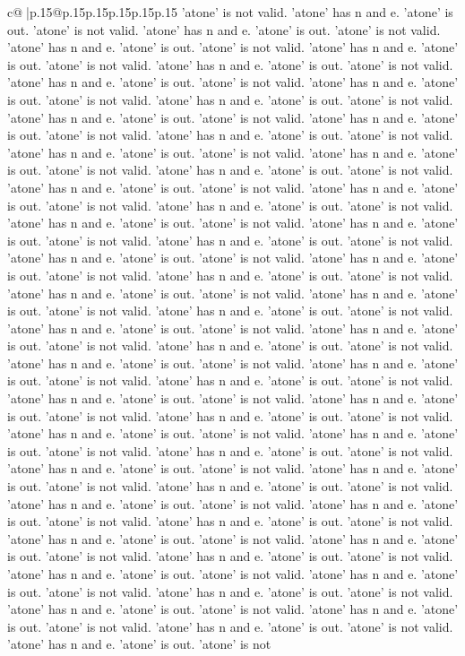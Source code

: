 \documentclass{article}
\begin{document}
{\begin{supertabular}{c@{$\;$}|p{.15\linewidth}@{}p{.15\linewidth}p{.15\linewidth}p{.15\linewidth}p{.15\linewidth}p{.15\linewidth}}
{{{'atone' is not valid. 'atone' has n and e. 'atone' is out. 'atone' is not valid. 'atone' has n and e. 'atone' is out. 'atone' is not valid. 'atone' has n and e. 'atone' is out. 'atone' is not valid. 'atone' has n and e. 'atone' is out. 'atone' is not valid. 'atone' has n and e. 'atone' is out. 'atone' is not valid. 'atone' has n and e. 'atone' is out. 'atone' is not valid. 'atone' has n and e. 'atone' is out. 'atone' is not valid. 'atone' has n and e. 'atone' is out. 'atone' is not valid. 'atone' has n and e. 'atone' is out. 'atone' is not valid. 'atone' has n and e. 'atone' is out. 'atone' is not valid. 'atone' has n and e. 'atone' is out. 'atone' is not valid. 'atone' has n and e. 'atone' is out. 'atone' is not valid. 'atone' has n and e. 'atone' is out. 'atone' is not valid. 'atone' has n and e. 'atone' is out. 'atone' is not valid. 'atone' has n and e. 'atone' is out. 'atone' is not valid. 'atone' has n and e. 'atone' is out. 'atone' is not valid. 'atone' has n and e. 'atone' is out. 'atone' is not valid. 'atone' has n and e. 'atone' is out. 'atone' is not valid. 'atone' has n and e. 'atone' is out. 'atone' is not valid. 'atone' has n and e. 'atone' is out. 'atone' is not valid. 'atone' has n and e. 'atone' is out. 'atone' is not valid. 'atone' has n and e. 'atone' is out. 'atone' is not valid. 'atone' has n and e. 'atone' is out. 'atone' is not valid. 'atone' has n and e. 'atone' is out. 'atone' is not valid. 'atone' has n and e. 'atone' is out. 'atone' is not valid. 'atone' has n and e. 'atone' is out. 'atone' is not valid. 'atone' has n and e. 'atone' is out. 'atone' is not valid. 'atone' has n and e. 'atone' is out. 'atone' is not valid. 'atone' has n and e. 'atone' is out. 'atone' is not valid. 'atone' has n and e. 'atone' is out. 'atone' is not valid. 'atone' has n and e. 'atone' is out. 'atone' is not valid. 'atone' has n and e. 'atone' is out. 'atone' is not valid. 'atone' has n and e. 'atone' is out. 'atone' is not valid. 'atone' has n and e. 'atone' is out. 'atone' is not valid. 'atone' has n and e. 'atone' is out. 'atone' is not valid. 'atone' has n and e. 'atone' is out. 'atone' is not valid. 'atone' has n and e. 'atone' is out. 'atone' is not valid. 'atone' has n and e. 'atone' is out. 'atone' is not valid. 'atone' has n and e. 'atone' is out. 'atone' is not valid. 'atone' has n and e. 'atone' is out. 'atone' is not valid. 'atone' has n and e. 'atone' is out. 'atone' is not valid. 'atone' has n and e. 'atone' is out. 'atone' is not valid. 'atone' has n and e. 'atone' is out. 'atone' is not valid. 'atone' has n and e. 'atone' is out. 'atone' is not valid. 'atone' has n and e. 'atone' is out. 'atone' is not valid. 'atone' has n and e. 'atone' is out. 'atone' is not valid. 'atone' has n and e. 'atone' is out. 'atone' is not valid. 'atone' has n and e. 'atone' is out. 'atone' is not valid. 'atone' has n and e. 'atone' is out. 'atone' is not valid. 'atone' has n and e. 'atone' is out. 'atone' is not valid. 'atone' has n and e. 'atone' is out. 'atone' is not valid. 'atone' has n and e. 'atone' is out. 'atone' is not valid. 'atone' has n and e. 'atone' is out. 'atone' is not valid. 'atone' has n and e. 'atone' is out. 'atone' is not }}}
\end{supertabular}}
\end{document}
